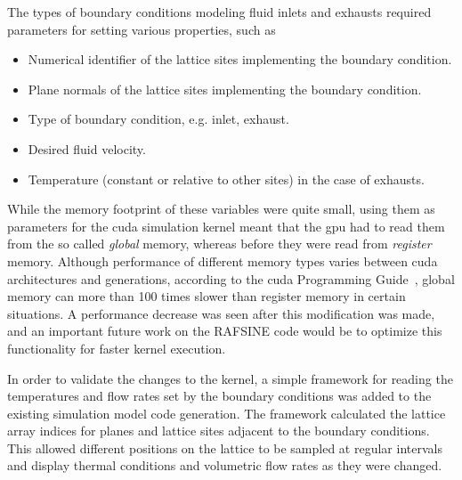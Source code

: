 The types of boundary conditions modeling fluid inlets and exhausts required parameters for setting various properties, such as
\begin{itemize}
\item Numerical identifier of the lattice sites implementing the boundary condition.
\item Plane normals of the lattice sites implementing the boundary condition.
\item Type of boundary condition, e.g. inlet, exhaust.
\item Desired fluid velocity.
\item Temperature (constant or relative to other sites) in the case of exhausts.
\end{itemize}
While the memory footprint of these variables were quite small, using them as parameters for the \gls{cuda} simulation kernel meant that the \gls{gpu} had to read them from the so called \textit{global} memory, whereas before they were read from \textit{register} memory. Although performance of different memory types varies between \gls{cuda} architectures and generations, according to the \gls{cuda} Programming Guide~\cite{cuda_guide}, global memory can more than 100 times slower than register memory in certain situations. A performance decrease was seen after this modification was made, and an important future work on the RAFSINE code would be to optimize this functionality for faster kernel execution.

In order to validate the changes to the kernel, a simple framework for reading the temperatures and flow rates set by the boundary conditions was added to the existing simulation model code generation. The framework calculated the lattice array indices for planes and lattice sites adjacent to the boundary conditions. This allowed different positions on the lattice to be sampled at regular intervals and display thermal conditions and volumetric flow rates as they were changed.
